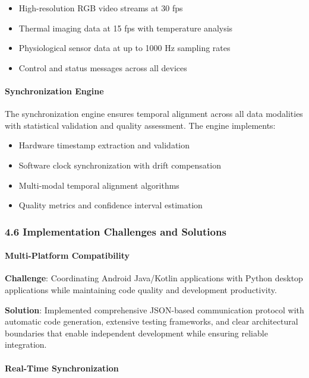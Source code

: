 \documentclass[12pt,a4paper]{report}
\begin{document}
\begin{itemize}
\item High-resolution RGB video streams at 30 fps
\item Thermal imaging data at 15 fps with temperature analysis
\item Physiological sensor data at up to 1000 Hz sampling rates
\item Control and status messages across all devices

\end{itemize}
\paragraph{Synchronization Engine}

The synchronization engine ensures temporal alignment across all data modalities with statistical validation and quality
assessment. The engine implements:

\begin{itemize}
\item Hardware timestamp extraction and validation
\item Software clock synchronization with drift compensation
\item Multi-modal temporal alignment algorithms
\item Quality metrics and confidence interval estimation

\end{itemize}
\subsubsection{4.6 Implementation Challenges and Solutions}

\paragraph{Multi-Platform Compatibility}

\textbf{Challenge}: Coordinating Android Java/Kotlin applications with Python desktop applications while maintaining code
quality and development productivity.

\textbf{Solution}: Implemented comprehensive JSON-based communication protocol with automatic code generation, extensive
testing frameworks, and clear architectural boundaries that enable independent development while ensuring reliable
integration.

\paragraph{Real-Time Synchronization}
\end{document}
